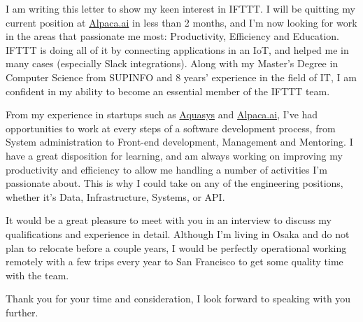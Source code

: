 \documentclass[10pt,stdletter,dateno,sigleft]{newlfm} %
\begin{document}
\begin{newlfm}


I am writing this letter to show my keen interest in IFTTT. I will be
quitting my current position at \href{https://www.alpaca.ai/}{Alpaca.ai}
in less than 2 months, and I'm now looking for work in the areas that
passionate me most: Productivity, Efficiency and Education. IFTTT is doing all
of it by connecting applications in an IoT, and helped me in many cases
(especially Slack integrations). Along with my Master's Degree in Computer
Science from SUPINFO and 8 years' experience in the field of IT, I am confident
in my ability to become an essential member of the IFTTT team.

From my experience in startups such as
\href{http://www.aquasys.co.jp/}{Aquasys} and
\href{https://www.alpaca.ai/}{Alpaca.ai}, I've had opportunities to work at
every steps of a software development process, from System administration to
Front-end development, Management and Mentoring. I have a great disposition for
learning, and am always working on improving my productivity and efficiency to
allow me handling a number of activities I'm passionate about. This is why I
could take on any of the engineering positions, whether it's Data,
Infrastructure, Systems, or API.

It would be a great pleasure to meet with you in an interview to discuss my
qualifications and experience in detail. Although I'm living in Osaka and do not
plan to relocate before a couple years, I would be perfectly operational working
remotely with a few trips every year to San Francisco to get some quality time
with the team.

Thank you for your time and consideration, I look forward to speaking with you
further.


\end{newlfm}
\end{document}
